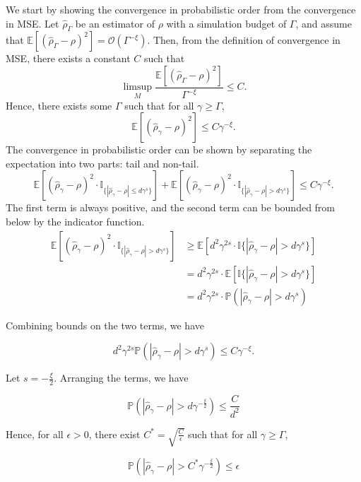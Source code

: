 We start by showing the convergence in probabilistic order from the convergence in MSE.
Let $\hat{\rho}_{\Gamma}$ be an estimator of $\rho$ with a simulation budget of $\Gamma$, and assume that $\mathbb{E} \left[ \left(\hat{\rho}_{\Gamma} - \rho\right)^2 \right] = \mathcal{O} \left( \Gamma^{-\xi} \right)$.
Then, from the definition of convergence in MSE, there exists a constant $C$ such that 
$$
    \limsup_{M} \frac{\mathbb{E} \left[ \left(\hat{\rho}_{\Gamma} - \rho\right)^2 \right]}{\Gamma^{-\xi}} \leq C.
$$
Hence, there exists some $\Gamma$ such that for all $\gamma \geq \Gamma$,
$$
\mathbb{E} \left[ \left(\hat{\rho}_{\gamma} - \rho\right)^2 \right] \leq C\gamma^{-\xi}.
$$
The convergence in probabilistic order can be shown by separating the expectation into two parts: tail and non-tail.
$$
\mathbb{E} \left[ \left(\hat{\rho}_{\gamma} - \rho\right)^2 \cdot \mathbb{I}_{\{|\hat{\rho}_{\gamma} - \rho| \leq d\gamma^s\}} \right] + \mathbb{E} \left[ \left(\hat{\rho}_{\gamma} - \rho\right)^2 \cdot \mathbb{I}_{\{|\hat{\rho}_{\gamma} - \rho| > d\gamma^s\}} \right] \leq C\gamma^{-\xi}.
$$
The first term is always positive, and the second term can be bounded from below by the indicator function.
\begin{align*}
\mathbb{E} \left[ \left(\hat{\rho}_{\gamma} - \rho\right)^2 \cdot \mathbb{I}_{\{|\hat{\rho}_{\gamma} - \rho| > d\gamma^s\}} \right] 
& \geq \mathbb{E} \left[ d^2 \gamma^{2s} \cdot \mathbb{I}\{|\hat{\rho}_{\gamma} - \rho| > d\gamma^s\} \right] \\
& = d^2 \gamma^{2s} \cdot \mathbb{E} \left[ \mathbb{I}\{|\hat{\rho}_{\gamma} - \rho| > d\gamma^s \} \right] \\
& = d^2 \gamma^{2s} \cdot \mathbb{P} \left(|\hat{\rho}_{\gamma} - \rho| > d\gamma^s \right)
\end{align*}

Combining bounds on the two terms, we have

$$
    d^2 \gamma^{2s} \mathbb{P} \left(|\hat{\rho}_{\gamma} - \rho| > d\gamma^s \right) \leq C \gamma^{-\xi}.
$$

Let $s = -\frac{\xi}{2}$. Arranging the terms, we have

$$
    \mathbb{P} \left( |\hat{\rho}_{\gamma} - \rho| > d\gamma^{-\frac{\xi}{2}} \right) \leq \frac{C}{d^2}
$$

Hence, for all $\epsilon >0$, there exist $C^* = \sqrt{\frac{C}{\epsilon}}$ such that for all $\gamma \geq \Gamma$,

$$
    \mathbb{P} \left( |\hat{\rho}_{\gamma} - \rho| > C^*\gamma^{-\frac{\xi}{2}} \right) \leq \epsilon
$$

